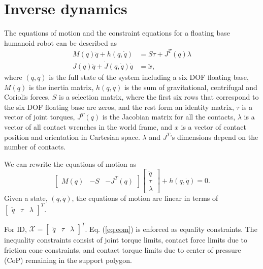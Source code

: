 \documentclass{ws-ijhr}
\newcommand{\eref}[1] {Eq. (\ref{#1})}
\newcommand{\QPx}{\mathcal{X}}
\begin{document}
\section{Inverse dynamics}
\label{sec:ID}
The equations of motion and the constraint equations for a floating base humanoid 
robot can be described as
\begin{equation*}
  \begin{split}
    M(q)\ddot{q} + h(q,\dot{q}) &= S\tau + J^T(q)\lambda \\
    J(q)\ddot{q} + \dot{J}(q,\dot{q})\dot{q} &= \ddot{x},
  \end{split}
\end{equation*}
where $(q,\dot{q})$ is the full state of the system including a six DOF floating 
base, $M(q)$ is the inertia matrix, $h(q,\dot{q})$ 
is the sum of gravitational, centrifugal and Coriolis forces, $S$ is a selection
matrix, where the first six rows that correspond to the six DOF floating base are 
zeros, and the rest form an identity matrix, $\tau$ is a vector of joint torques, 
$J^T(q)$ is the Jacobian matrix for all the contacts, $\lambda$ is a vector
of all contact wrenches in the world frame, and $x$ is a vector of  
contact position and orientation in Cartesian space. $\lambda$ and $J^T$'s 
dimensions depend on the number of contacts. 

We can rewrite the equations of motion as 
\begin{equation}
  \begin{bmatrix} M(q) & -S & -J^T(q) \end{bmatrix} 
  \begin{bmatrix} \ddot{q} \\ \tau \\ \lambda \end{bmatrix}
  +h(q,\dot{q}) = 0.
		\label{eq:eom}
\end{equation}
Given a state, $(q,\dot{q})$, the equations of motion are linear in terms of 
$\begin{bmatrix} \ddot{q} & \tau & \lambda \end{bmatrix}^T$. 

For ID, $\QPx = \begin{bmatrix} \ddot{q} & \tau & \lambda \end{bmatrix}^T$.
\eref{eq:eom} is enforced as equality constraints. The 
inequality constraints consist of joint torque limits, contact force limits 
due to friction cone constraints, and contact torque limits due to center of 
pressure (CoP) remaining in the support polygon. 
\end{document}
